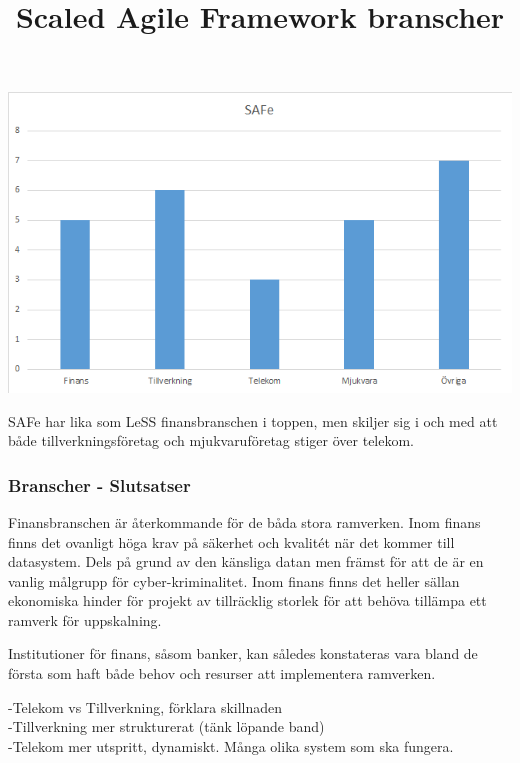 				
			\title{Scaled Agile Framework branscher}
			\begin{center}
				\includegraphics{Grafer/SAFe_brancher.png}
			\end{center}
					
			SAFe har lika som LeSS finansbranschen i toppen, men skiljer sig i och med att både tillverkningsföretag och mjukvaruföretag stiger över telekom.
			
		\subsubsection{Branscher - Slutsatser}
		
			Finansbranschen är återkommande för de båda stora ramverken. Inom finans finns det ovanligt höga krav på säkerhet och kvalitét när det kommer till datasystem. Dels på grund av den känsliga datan men främst för att de är en vanlig målgrupp för cyber-kriminalitet. Inom finans finns det heller sällan ekonomiska hinder för projekt av tillräcklig storlek för att behöva tillämpa ett ramverk för uppskalning. 
			
			Institutioner för finans, såsom banker, kan således konstateras vara bland de första som haft både behov och resurser att implementera ramverken.
			
			
			-Telekom vs Tillverkning, förklara skillnaden \\
			-Tillverkning mer strukturerat (tänk löpande band) \\
			-Telekom mer utspritt, dynamiskt. Många olika system som ska fungera. \\
						
	

